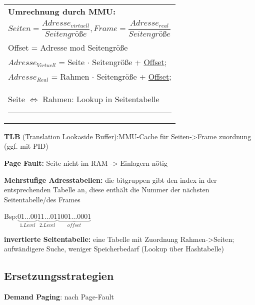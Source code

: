 \begin{tabular}[width=\textwidth]{|l|}
\hline
\textbf{Umrechnung durch MMU: }\\
$Seiten = \dfrac{Adresse_{virtuell}}{\textit{Seitengröße}}, Frame = \dfrac{Adresse_{real}}{\textit{Seitengröße}} $\\
Offset = Adresse mod Seitengröße\\
$Adresse_{Virtuell}$ = Seite $\cdot$ Seitengröße + \underline{Offset};\\
$Adresse_{Real}$ = Rahmen $\cdot$ Seitengröße + \underline{Offset};\\
Seite $\Leftrightarrow$ Rahmen: Lookup in Seitentabelle \rule{0.25\textwidth}{0em} \\
\hline
\end{tabular}


\textbf{TLB} (Translation Lookaside Buffer):MMU-Cache für Seiten->Frame zuordnung (ggf. mit PID)

\textbf{Page Fault:} Seite nicht im RAM -> Einlagern nötig

\textbf{Mehrstufige Adresstabellen:} die bitgruppen gibt den index in der entsprechenden Tabelle an, diese enthält die Nummer der nächsten Seitentabelle/des Frames

Bsp:$ \underbrace{01\dots00}_{1.Level}\underbrace{11\dots01}_{2.Level}\underbrace{1001\dots0001}_{offset}$

\textbf{invertierte Seitentabelle:} eine Tabelle mit Zuordnung Rahmen->Seiten;\\ aufwändigere Suche, weniger Speicherbedarf (Lookup über Hashtabelle)
\subsection{Ersetzungsstrategien}
\textbf{Demand Paging}: nach Page-Fault

